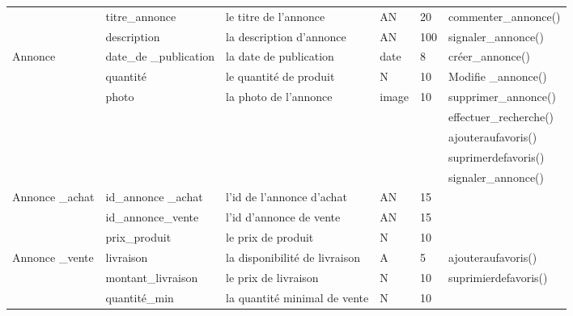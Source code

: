 \documentclass[edit,12pt,a4paper,ChapStyle,oneside,doubleinterligne]{report}
\begin{document}
\begin{table}[H]
\begin{tabular}{ | m{} | m{}| m{3cm} |m{}|m{}|l|}
                                          &titre\_annonce&le titre de l'annonce&AN&20&commenter\_annonce()\\\cline{2-6}
                                          &description&la description d'annonce&AN&100&signaler\_annonce()\\\cline{2-6}
                                Annonce   &date\_de \_publication&la date de publication&date&8&créer\_annonce()\\\cline{2-6}
                                          &quantité&le quantité de produit &N&10&Modifie \_annonce()\\\cline{2-6}
                                          &photo &la photo de l'annonce   &image&10&supprimer\_annonce()\\\cline{2-6}
                                          & &   &&&effectuer\_recherche()\\\cline{2-6}
                                          & &   &&&ajouteraufavoris()\\\cline{2-6}
                                          & &   &&&suprimerdefavoris()\\\cline{2-6}
                                          & &   &&&signaler\_annonce()\\\hline

                        Annonce \_achat   &id\_annonce \_achat &l'id de l'annonce d'achat&AN&15& \\\hline
                                  


                                          &id\_annonce\_vente&l'id d'annonce de vente&AN&15&\\\cline{2-5}
                                          &prix\_produit&le prix de produit&N&10&\\\cline{2-6}
                        Annonce \_vente   &livraison&la disponibilité de livraison&A&5&ajouteraufavoris() \\\cline{2-6}
                                          &montant\_livraison&le prix de livraison&N&10&suprimierdefavoris() \\\cline{2-6}
                                          &quantité\_min&la quantité minimal de vente&N&10& \\\hline


                                                              
          
    \end{tabular}
\end{table}
\end{document}
